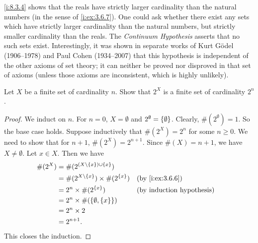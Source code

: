\setcounter{thm}{5}
\begin{rmk}\label{i:8.3.6}
  \cref{i:8.3.4} shows that the reals have strictly larger cardinality than the natural numbers (in the sense of \cref{i:ex:3.6.7}).
  One could ask whether there exist any sets which have strictly larger cardinality than the natural numbers, but strictly smaller cardinality than the reals.
  The \emph{Continuum Hypothesis} asserts that no such sets exist.
  Interestingly, it was shown in separate works of Kurt Gödel (1906--1978) and Paul Cohen (1934--2007) that this hypothesis is independent of the other axioms of set theory;
  it can neither be proved nor disproved in that set of axioms
  (unless those axioms are inconsistent, which is highly unlikely).
\end{rmk}

\exercisesection

\begin{ex}\label{i:ex:8.3.1}
  Let \(X\) be a finite set of cardinality \(n\).
  Show that \(2^X\) is a finite set of cardinality \(2^n\).
\end{ex}

\begin{proof}
  We induct on \(n\).
  For \(n = 0\), \(X = \emptyset\) and \(2^{\emptyset} = \left\lbrace\emptyset\right\rbrace\).
  Clearly, \(\#(2^{\emptyset}) = 1\).
  So the base case holds.
  Suppose inductively that \(\#(2^X) = 2^n\) for some \(n \geq 0\).
  We need to show that for \(n + 1\), \(\#(2^X) = 2^{n + 1}\).
  Since \(\#(X) = n + 1\), we have \(X \neq \emptyset\).
  Let \(x \in X\).
  Then we have
  \begin{align*}
    \#(2^X) & = \#(2^{(X \setminus \set{x}) \cup \set{x}})                              \\
            & = \#(2^{X \setminus \set{x}}) \times \#(2^{\set{x}}) &  & \by{i:ex:3.6.6} \\
            & = 2^n \times \#(2^{\set{x}})                         &  & \byIH           \\
            & = 2^n \times \#(\set{\emptyset, \set{x}})                                 \\
            & = 2^n \times 2                                                            \\
            & = 2^{n + 1}.
  \end{align*}
  This closes the induction.
\end{proof}


